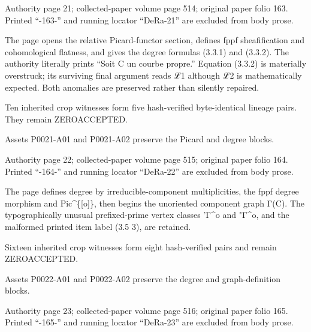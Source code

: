 \documentclass[11pt,a4paper]{article}
\begin{document}
\par\medskip
\hypertarget{D018-P0021}{}
\par\smallskip
Authority page 21; collected-paper volume page 514; original paper folio 163. Printed “-163-” and running locator “DeRa-21” are excluded from body prose.

The page opens the relative Picard-functor section, defines fppf sheafification and cohomological flatness, and gives the degree formulas (3.3.1) and (3.3.2). The authority literally prints “Soit C un courbe propre.” Equation (3.3.2) is materially overstruck; its surviving final argument reads ℒ\textunderscore{}1 although ℒ\textunderscore{}2 is mathematically expected. Both anomalies are preserved rather than silently repaired.

Ten inherited crop witnesses form five hash-verified byte-identical lineage pairs. They remain ZERO\textunderscore{}ACCEPTED.

Assets P0021-A01 and P0021-A02 preserve the Picard and degree blocks.


\par\medskip
\hypertarget{D018-P0022}{}
\par\smallskip
Authority page 22; collected-paper volume page 515; original paper folio 164. Printed “-164-” and running locator “DeRa-22” are excluded from body prose.

The page defines degree by irreducible-component multiplicities, the fppf degree morphism and Pic\textasciicircum{}\{[o]\}, then begins the unoriented component graph Γ(C). The typographically unusual prefixed-prime vertex classes 'Γ\textasciicircum{}o and "Γ\textasciicircum{}o, and the malformed printed item label (3.5 3), are retained.

Sixteen inherited crop witnesses form eight hash-verified pairs and remain ZERO\textunderscore{}ACCEPTED.

Assets P0022-A01 and P0022-A02 preserve the degree and graph-definition blocks.


\par\medskip
\hypertarget{D018-P0023}{}
\par\smallskip
Authority page 23; collected-paper volume page 516; original paper folio 165. Printed “-165-” and running locator “DeRa-23” are excluded from body prose.
\end{document}
